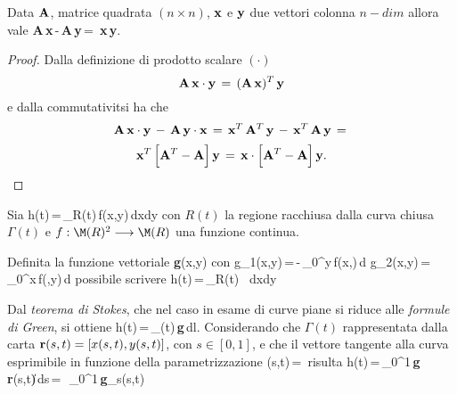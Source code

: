 

\blem
Data ${\bf A}$, matrice quadrata $(n \times n)$, ${\bf x}$ e ${\bf y}$ due vettori colonna
$n-dim$ allora vale
 \be
 {\bf A}\,{\bf x}\,-\,{\bf A}\,{\bf y}\,=\,
             {\bf x}\cdot\Big[{\bf A}^T-{\bf A}\Big]\,{\bf y}.
 \ee
{}
\elem

\begin{proof}
  Dalla definizione di prodotto scalare $(\cdot)$  
 $$
 {\bf A}\,{\bf x}\cdot{\bf y}\,=\,({\bf A}\,{\bf x})^T\,{\bf y}
 $$
 e dalla commutativit\a si ha che 
 $$
 {\bf A}\,{\bf x}\cdot{\bf y}\,-\,{\bf A}\,{\bf y}\cdot{\bf x}\,=\,
 {\bf x}^T\,{\bf A}^T\,{\bf y}\,-\,{\bf x}^T\,{\bf A}\,{\bf y}\,=\,
 $$
 $$ 
 {\bf x}^T\,\Big[{\bf A}^T-{\bf A}\Big]\,{\bf y}\,=\,
 {\bf x}\cdot\Big[{\bf A}^T-{\bf A}\Big]\,{\bf y}. 
 $$
\end{proof}


Sia
\be 
h(t)\,=\,\ds\int_{R(t)}\,f(x,y)\,dxdy
\ee
con $R(t)$ la regione racchiusa dalla curva chiusa $\Gamma(t)$ e $f:\M(R)^2 \longrightarrow \M(R)$
una funzione continua.

Definita la funzione vettoriale {\bf g}(x,y) con
\be
g_1(x,y)\,=\,-\,\ds\int_0^y\,f(x,\lambda)\,d\lambda \qquad
g_2(x,y)\,=\,\ds\int_0^x\,f(\lambda,y)\,d\lambda
\ee
\e possibile scrivere
\be
h(t)\,=\,\ds\int_{R(t)}\,\,
 \,dxdy
\ee

Dal {\it teorema di Stokes}, che nel caso in esame di curve piane si riduce alle {\it formule
di Green}, si ottiene 
\be 
h(t)\,=\,\ds\int_{\Gamma(t)}\,{\bf g}\cdot{\bf \tau}\,dl.
\ee
Considerando che $\Gamma(t)$ \e rappresentata dalla carta ${\bf r}(s,t)=[x(s,t),y(s,t)]$,
con $s \in [0,1]$\footnotemark, e che il vettore tangente alla curva \e esprimibile in funzione
della parametrizzazione
\be
{\bf \tau}(s,t)\,=\,
\ee
risulta
\be
h(t)\,=\,\ds\int_0^1\,{\bf g}\cdot{}\,
         {\|{\bf r}(s,t)\|}\,ds\,=\,
       \,\ds\int_0^1\,{\bf g}_s(s,t)
\ee

